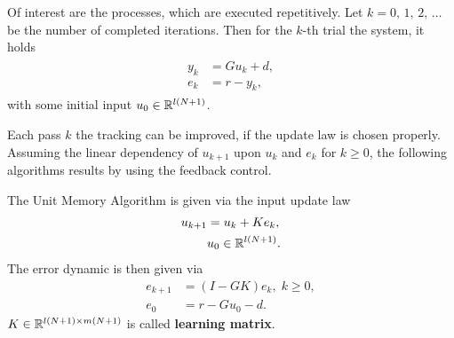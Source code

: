 Of interest are the processes, which are executed repetitively. Let $k = 0, \, 1, \, 2, \, \dots $ be the number of completed iterations. Then for the $k$-th trial the system, it holds
\begin{align}
\label{eq:unitMemory}
\begin{split}
y_{k} &= G u_k + d,  \\ %
e_k &= r - y_k, 
\end{split}
\end{align}
with some initial input $u_{0} \in {\mathbb{R}}^{l(N+1)}$. 



Each pass $k$ the tracking can be improved, if the update law is chosen properly. Assuming the linear dependency of $u_{k+1}$ upon $u_k$ and $e_k$ for $k \geq 0$, the following algorithms results by using the feedback control. 
\begin{alg}
	\label{alg: unitMemory}
	The Unit Memory Algorithm is given via the input update law 
	\begin{align}
	\label{eq:clPlant}
	\begin{split}
	u_{k+1} &= u_k + K e_k, \\
	& u_0 \in {\mathbb{R}}^{l (N+1)}.
	\end{split}
	\end{align}	 
	The error dynamic is then given via
	\begin{align}
	e _{k+1} &= (I - G K) e_{k}, \; k \geq 0,\\
	e_0 &= r -  Gu_0 -d.
	\end{align}
	$K \in {\mathbb{R}}^{l(N+1) \times m(N+1)}$ is called \textbf{learning matrix}. 
\end{alg}


